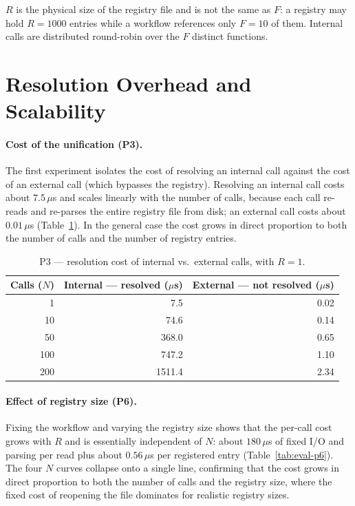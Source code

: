 $R$ is the physical size of the registry file and is not the same as $F$: a registry may hold
$R{=}1000$ entries while a workflow references only $F{=}10$ of them. Internal calls are
distributed round-robin over the $F$ distinct functions.

\section{Resolution Overhead and Scalability}
\label{sec:eval-resolution}

\paragraph{Cost of the unification (P3).}
The first experiment isolates the cost of resolving an internal call against the cost of an
external call (which bypasses the registry). Resolving an internal call costs about
$7.5\,\mu$s and scales linearly with the number of calls, because each call re-reads and re-parses
the entire registry file from disk; an external call costs about $0.01\,\mu$s
(Table~\ref{tab:eval-p3}). In the general case the cost grows in direct proportion to both the
number of calls and the number of registry entries.

\begin{table}[htbp]
  \centering
  \caption{P3 --- resolution cost of internal vs.\ external calls, with $R{=}1$.}
  \label{tab:eval-p3}
  \begin{tabular}{rrr}
    \hline
    \textbf{Calls ($N$)} & \textbf{Internal --- resolved ($\mu$s)} & \textbf{External --- not resolved ($\mu$s)} \\
    \hline
    1   & 7.5    & 0.02 \\
    10  & 74.6   & 0.14 \\
    50  & 368.0  & 0.65 \\
    100 & 747.2  & 1.10 \\
    200 & 1511.4 & 2.34 \\
    \hline
  \end{tabular}
\end{table}

\paragraph{Effect of registry size (P6).}
Fixing the workflow and varying the registry size shows that the per-call cost grows with $R$ and
is essentially independent of $N$: about $180\,\mu$s of fixed I/O and parsing per read plus about
$0.56\,\mu$s per registered entry (Table~\ref{tab:eval-p6}). The four $N$ curves collapse onto a
single line, confirming that the cost grows in direct proportion to both the number of calls and
the registry size, where the fixed cost of reopening the file dominates for realistic registry
sizes.

